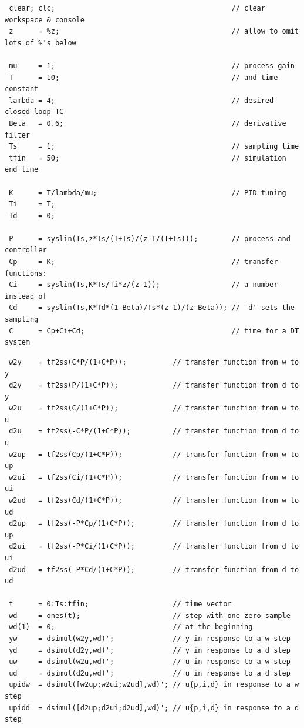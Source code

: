 \begin{frame}[fragile]
\myPause
 {\scriptsize
 \begin{verbatim}
 clear; clc;                                          // clear workspace & console
 z      = %z;                                         // allow to omit lots of %'s below

 mu     = 1;                                          // process gain  
 T      = 10;                                         // and time constant
 lambda = 4;                                          // desired closed-loop TC
 Beta   = 0.6;                                        // derivative filter
 Ts     = 1;                                          // sampling time
 tfin   = 50;                                         // simulation end time

 K      = T/lambda/mu;                                // PID tuning
 Ti     = T;
 Td     = 0;

 P      = syslin(Ts,z*Ts/(T+Ts)/(z-T/(T+Ts)));        // process and controller
 Cp     = K;                                          // transfer functions:
 Ci     = syslin(Ts,K*Ts/Ti*z/(z-1));                 // a number instead of
 Cd     = syslin(Ts,K*Td*(1-Beta)/Ts*(z-1)/(z-Beta)); // 'd' sets the sampling
 C      = Cp+Ci+Cd;                                   // time for a DT system
 \end{verbatim}
 }
\end{frame}

\begin{frame}[fragile]
\myPause
 {\scriptsize
 \begin{verbatim}
 w2y    = tf2ss(C*P/(1+C*P));           // transfer function from w to y
 d2y    = tf2ss(P/(1+C*P));             // transfer function from d to y
 w2u    = tf2ss(C/(1+C*P));             // transfer function from w to u
 d2u    = tf2ss(-C*P/(1+C*P));          // transfer function from d to u
 w2up   = tf2ss(Cp/(1+C*P));            // transfer function from w to up
 w2ui   = tf2ss(Ci/(1+C*P));            // transfer function from w to ui
 w2ud   = tf2ss(Cd/(1+C*P));            // transfer function from w to ud
 d2up   = tf2ss(-P*Cp/(1+C*P));         // transfer function from d to up
 d2ui   = tf2ss(-P*Ci/(1+C*P));         // transfer function from d to ui
 d2ud   = tf2ss(-P*Cd/(1+C*P));         // transfer function from d to ud

 t      = 0:Ts:tfin;                    // time vector
 wd     = ones(t);                      // step with one zero sample 
 wd(1)  = 0;                            // at the beginning
 yw     = dsimul(w2y,wd)';              // y in response to a w step
 yd     = dsimul(d2y,wd)';              // y in response to a d step
 uw     = dsimul(w2u,wd)';              // u in response to a w step
 ud     = dsimul(d2u,wd)';              // u in response to a d step
 upidw  = dsimul([w2up;w2ui;w2ud],wd)'; // u{p,i,d} in response to a w step
 upidd  = dsimul([d2up;d2ui;d2ud],wd)'; // u{p,i,d} in response to a d step
 \end{verbatim}
 }
\end{frame}

